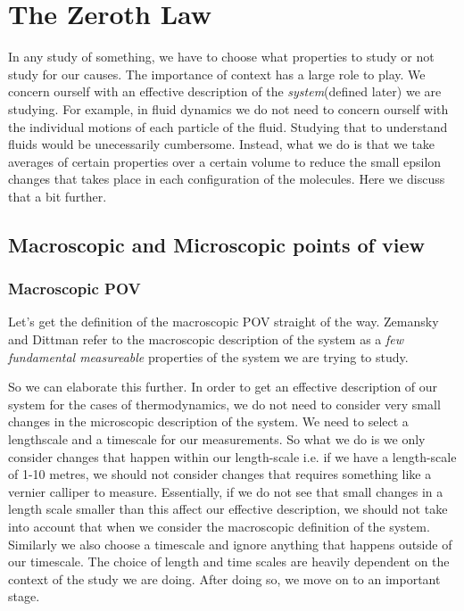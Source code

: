    \section{The Zeroth Law}
   In any study of something, we have to choose what properties to study or not 
   study for our causes. The importance of context has a large role to play. We concern ourself 
   with an effective description of the \emph{system}(defined later) we are studying. 
   For example, in fluid dynamics we do not need to concern ourself with the individual motions 
   of each particle of the fluid. Studying that to understand fluids would be unecessarily cumbersome.
   Instead, what we do is that we take averages of certain properties over a certain volume to 
   reduce the small epsilon changes that takes place in each configuration of the molecules. 
   Here we discuss that a bit further.

   \subsection{Macroscopic and Microscopic points of view}
   \subsubsection{Macroscopic POV}
   Let's get the definition of the macroscopic POV straight of the way. Zemansky and Dittman refer
   to the macroscopic description of the system as a \emph{few fundamental measureable} properties of 
   the system we are trying to study.   

   So we can elaborate this further. In order to get an effective description of our system for the 
   cases of thermodynamics,
   we do not need to consider very small changes in the microscopic description of the system. 
   We need to select a lengthscale and a timescale for our measurements. So what we do is we only 
   consider changes that happen within our length-scale i.e. if we have a length-scale of 1-10 
   metres, we should not consider changes that requires something like a vernier calliper to 
   measure. Essentially, if we do not see that small changes in a length scale smaller than this
    affect our effective description, we should not take into account that when we consider the 
   macroscopic definition of the system. Similarly we also choose a timescale and ignore anything 
   that happens outside of our timescale. The choice of length and time scales are heavily dependent 
   on the context of the study we are doing. After doing so, we move on to an important stage.


